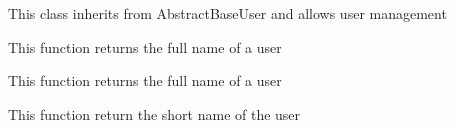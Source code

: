 \documentclass[letterpaper,10pt,english]{sphinxmanual}
\begin{document}

\begin{fulllineitems}
\label{modules/account:apps.account.models.User}
This class inherits from AbstractBaseUser and allows user management

\begin{fulllineitems}
\label{modules/account:apps.account.models.User.fullName}
This function returns the full name of a user

\end{fulllineitems}


\begin{fulllineitems}
\label{modules/account:apps.account.models.User.get_full_name}
This function returns the full name of a user

\end{fulllineitems}


\begin{fulllineitems}
\label{modules/account:apps.account.models.User.get_short_name}
This function return the short name of the user

\end{fulllineitems}


\end{fulllineitems}

\end{document}
